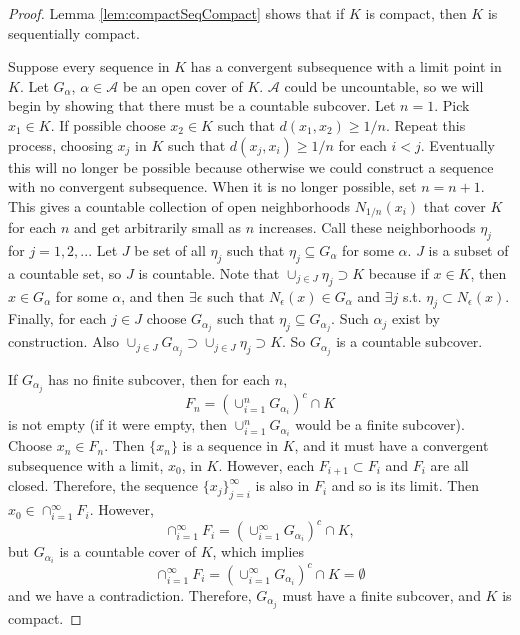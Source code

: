 \documentclass[12pt,reqno]{amsart}
\theoremstyle{definition}
\begin{document}
\begin{proof}
  Lemma \ref{lem:compactSeqCompact} shows that if $K$ is compact, then
  $K$ is sequentially compact.
  
  Suppose every sequence in $K$ has a convergent subsequence with a
  limit point in $K$. Let $G_{\alpha}$, $\alpha \in \mathcal{A}$ be an
  open cover of $K$. $\mathcal{A}$ could be uncountable, so we will
  begin by showing that there must be a countable subcover.  Let
  $n=1$. Pick $x_1 \in K$. If possible choose $x_2 \in K$ such that
  $d(x_1,x_2) \geq 1/n$. Repeat this process, choosing $x_j$ in $K$
  such that $d(x_j,x_i) \geq 1/n$ for each $i<j$. Eventually this will
  no longer be possible because otherwise we could construct a
  sequence with no convergent subsequence. When it is no longer
  possible, set $n = n+1$. This gives a countable collection of open
  neighborhoods $N_{1/n}(x_i)$ that cover $K$ for each $n$ and get
  arbitrarily small as $n$ increases. Call these neighborhoods
  $\eta_j$ for $j = 1,2,..$. Let $J$ be set of all $\eta_j$ such that
  $\eta_j \subseteq G_\alpha$ for some $\alpha$. $J$ is a subset of a
  countable set, so $J$ is countable. Note that $\cup_{j \in J} \eta_j
  \supset K$ because if $x \in K$, then $x \in G_\alpha$ for some
  $\alpha$, and then $\exists \epsilon$ such that $N_{\epsilon}(x) \in
  G_{\alpha}$ and $\exists j$ s.t. $\eta_j \subset N_{\epsilon}(x)$.
  Finally, for each $j \in J$ choose $G_{\alpha_j}$ such that $\eta_j
  \subseteq G_{\alpha_j}$. Such $\alpha_j$ exist by construction. Also
  $\cup_{j \in J} G_{\alpha_j} \supset \cup_{j \in J} \eta_j \supset
  K$. So $G_{\alpha_j}$ is a countable subcover.

  If $G_{\alpha_j}$ has no finite subcover, then for each $n$, 
  \[ F_n = \left(\cup_{i=1}^n G_{\alpha_i}\right)^c \cap K \] is not
  empty (if it were empty, then $\cup_{i=1}^n G_{\alpha_i}$ would be a
  finite subcover). Choose $x_n \in F_n$. Then $\{x_n\}$ is a sequence in $K$,
  and it must have a convergent subsequence with a limit, $x_0$, in
  $K$. However, each $F_{i+1} \subset F_i$ and $F_i$ are all
  closed. Therefore, the sequence $\{x_j\}_{j=i}^\infty$ is also in
  $F_i$ and so is its limit. Then $x_0 \in \cap_{i=1}^\infty
  F_i$. However, 
  \[ \cap_{i=1}^\infty F_i = \left(\cup_{i=1}^\infty
    G_{\alpha_i}\right)^c \cap K, \]  
  but $G_{\alpha_i}$ is a countable cover of $K$, which implies 
  \[ \cap_{i=1}^\infty F_i = \left(\cup_{i=1}^\infty
    G_{\alpha_i}\right)^c \cap K = \emptyset\] 
  and we have a contradiction. Therefore, $G_{\alpha_j}$ must have a
  finite subcover, and $K$ is compact.
\end{proof}
\end{document}
